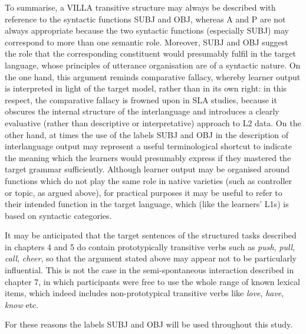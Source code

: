 To summarise, a VILLA transitive structure may always be described with reference to the syntactic functions SUBJ and OBJ, whereas A and P are not always appropriate because the two syntactic functions (especially SUBJ) may correspond to more than one semantic role. Moreover, SUBJ and OBJ suggest the role that the corresponding constituent would presumably fulfil in the target language, whose principles of utterance organisation are of a syntactic nature. On the one hand, this argument reminds  comparative fallacy, whereby learner output is interpreted in light of the target model, rather than in its own right: in this respect, the comparative fallacy is frowned upon in SLA studies, because it obscures the internal structure of the interlanguage and introduces a clearly evaluative (rather than descriptive or interpretative) approach to L2 data. On the other hand, at times the use of the labels SUBJ and OBJ in the description of interlanguage output may represent a useful terminological shortcut to indicate the meaning which the learners would presumably express if they mastered the target grammar sufficiently. Although learner output may be organised around functions which do not play the same role in native varieties (such as controller or topic, as argued above), for practical purposes it may be useful to refer to their intended function in the target language, which (like the learners’ L1s) is based on syntactic categories.

It may be anticipated that the target sentences of the structured tasks described in chapters 4 and 5 do contain prototypically transitive verbs such as \textit{push}, \textit{pull}, \textit{call}, \textit{cheer}, so that the argument stated above may appear not to be particularly influential. This is not the case in the semi-spontaneous interaction described in chapter 7, in which participants were free to use the whole range of known lexical items, which indeed includes non-prototypical transitive verbs like \textit{love}, \textit{have}, \textit{know} etc.

For these reasons the labels SUBJ and OBJ will be used throughout this study. 

